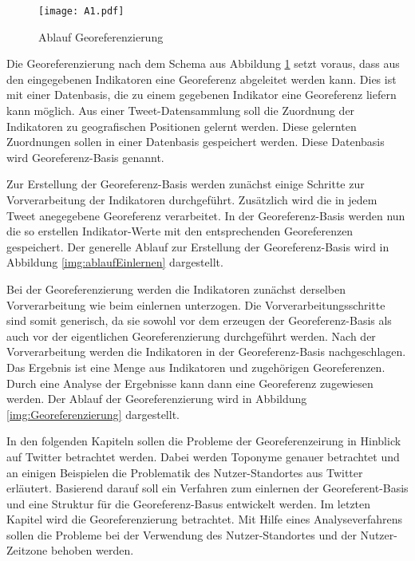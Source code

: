 		\begin{figure}[h!]
			\begin{center}
				\texttt{[image: A1.pdf]}
				\caption{Ablauf Georeferenzierung}
				\label{img:georef}
			\end{center}
		\end{figure}	

		Die Georeferenzierung nach dem Schema aus Abbildung \ref{img:georef} setzt voraus, dass aus den eingegebenen Indikatoren eine Georeferenz abgeleitet werden kann.     
		Dies ist mit einer Datenbasis, die zu einem gegebenen Indikator eine Georeferenz liefern kann möglich.
		Aus einer Tweet-Datensammlung soll die Zuordnung der Indikatoren zu geografischen Positionen gelernt werden.
		Diese gelernten Zuordnungen sollen in einer Datenbasis gespeichert werden.
		Diese Datenbasis wird Georeferenz-Basis genannt.
		
		Zur Erstellung der Georeferenz-Basis werden zunächst einige Schritte zur Vorverarbeitung der Indikatoren durchgeführt.
		Zusätzlich wird die in jedem Tweet anegegebene Georeferenz verarbeitet.
		In der Georeferenz-Basis werden nun die so erstellen Indikator-Werte mit den entsprechenden Georeferenzen gespeichert.
		Der generelle Ablauf zur Erstellung der Georeferenz-Basis wird in Abbildung \ref{img:ablaufEinlernen} dargestellt.

		Bei der Georeferenzierung werden die Indikatoren zunächst derselben Vorverarbeitung wie beim einlernen unterzogen.
		Die Vorverarbeitungsschritte sind somit generisch, da sie sowohl vor dem erzeugen der Georeferenz-Basis als auch vor der eigentlichen Georeferenzierung durchgeführt werden.
		Nach der Vorverarbeitung werden die Indikatoren in der Georeferenz-Basis nachgeschlagen.
		Das Ergebnis ist eine Menge aus Indikatoren und zugehörigen Georeferenzen. 
		Durch eine Analyse der Ergebnisse kann dann eine Georeferenz zugewiesen werden.
		Der Ablauf der Georeferenzierung wird in Abbildung \ref{img:Georeferenzierung} dargestellt. 


		In den folgenden Kapiteln sollen die Probleme der Georeferenzeirung in Hinblick auf Twitter betrachtet werden. 
		Dabei werden Toponyme genauer betrachtet und an einigen Beispielen die Problematik des Nutzer-Standortes aus Twitter erläutert.
		Basierend darauf soll ein Verfahren zum einlernen der Georeferent-Basis und eine Struktur für die Georeferenz-Basus entwickelt werden.
		Im letzten Kapitel wird die Georeferenzierung betrachtet.
		Mit Hilfe eines Analyseverfahrens sollen die Probleme bei der Verwendung des Nutzer-Standortes und der Nutzer-Zeitzone behoben werden.

